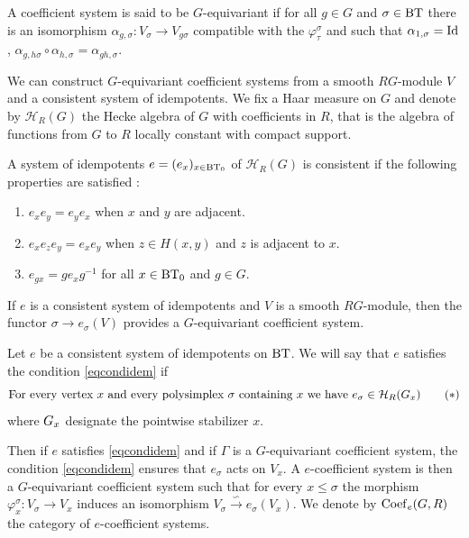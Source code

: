 \documentclass[a4paper,10pt]{amsart}
\begin{document}
\bigskip

A coefficient system is said to be $G$-equivariant if for all $g \in G$ and $\sigma \in \bt$ there is an isomorphism $\alpha_{g,\sigma}: V_{\sigma} \rightarrow V_{g\sigma}$ compatible with the $\varphi_{\tau}^{\sigma}$ and such that $\alpha_{1,\sigma}=\Id$, $\alpha_{g,h\sigma} \circ \alpha_{h,\sigma} = \alpha_{gh,\sigma}$.


\bigskip

We can construct $G$-equivariant coefficient systems from a smooth $RG$-module $V$ and a consistent system of idempotents. We fix a Haar measure on $G$ and denote by $\mathcal{H}_{R}(G)$ the Hecke algebra of $G$ with coefficients in $R$, that is the algebra of functions from $G$ to $R$ locally constant with compact support.


\begin{Def}
\label{defcoherent}
A system of idempotents $e=(e_{x})_{x\in \bts}$ of $\mathcal{H}_{R}(G)$ is consistent if the following properties are satisfied :
\begin{enumerate}
\item $e_{x}e_{y}=e_{y}e_{x}$ when $x$ and $y$ are adjacent.
\item $e_{x}e_{z}e_{y}=e_{x}e_{y}$ when $z \in H(x,y)$ and $z$ is adjacent to $x$.
\item $e_{gx}=ge_{x}g^{-1}$ for all $x\in \bts$ and $g\in G$.
\end{enumerate}
\end{Def}


If $e$ is a consistent system of idempotents and $V$ is a smooth $RG$-module, then the functor $\sigma \to e_{\sigma}(V)$ provides a $G$-equivariant coefficient system.

\bigskip

Let $e$ be a consistent system of idempotents on $\bt$. We will say that $e$ satisfies the condition \eqref{eqcondidem} if
\begin{equation}
\label{eqcondidem}
\text{For every vertex } x \text{ and every polysimplex } \sigma \text{ containing } x \text{ we have } e_\sigma \in \hecke{\fix{G}{x}}{R}
\tag{$\ast$}
\end{equation}
where $\fix{G}{x}$ designate the pointwise stabilizer $x$.


Then if $e$ satisfies \eqref{eqcondidem} and if $\Gamma$ is a $G$-equivariant coefficient system, the condition \eqref{eqcondidem} ensures that $e_\sigma$ acts on $V_x$. A $e$-coefficient system is then a $G$-equivariant coefficient system such that for every  $x \leq \sigma$ the morphism $\varphi_{x}^{\sigma} : V_{\sigma} \rightarrow V_{x}$ induces an isomorphism $V_{\sigma} \overset{\backsim}{\rightarrow} e_{\sigma}(V_{x})$. We denote by $\coef$ the category of $e$-coefficient systems.
\end{document}
